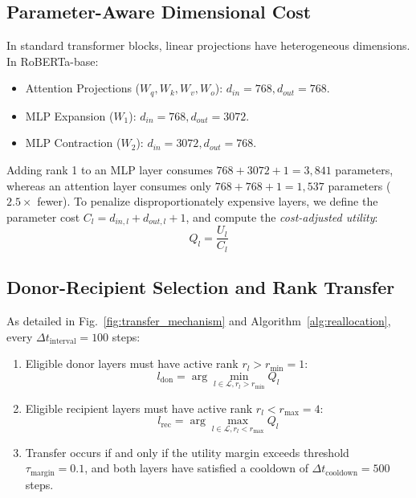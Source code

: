 \documentclass[conference]{IEEEtran}
\begin{document}
\subsection{Parameter-Aware Dimensional Cost}
In standard transformer blocks, linear projections have heterogeneous dimensions. In RoBERTa-base:
\begin{itemize}
  \item Attention Projections ($W_q, W_k, W_v, W_o$): $d_{in} = 768, d_{out} = 768$.
  \item MLP Expansion ($W_1$): $d_{in} = 768, d_{out} = 3072$.
  \item MLP Contraction ($W_2$): $d_{in} = 3072, d_{out} = 768$.
\end{itemize}
Adding rank 1 to an MLP layer consumes $768 + 3072 + 1 = 3,841$ parameters, whereas an attention layer consumes only $768 + 768 + 1 = 1,537$ parameters ($2.5\times$ fewer). To penalize disproportionately expensive layers, we define the parameter cost $C_l = d_{in,l} + d_{out,l} + 1$, and compute the \textit{cost-adjusted utility}:
\begin{equation}
  Q_l = \frac{U_l}{C_l}
  \label{eq:cost_utility}
\end{equation}

\subsection{Donor-Recipient Selection and Rank Transfer}
As detailed in Fig.~\ref{fig:transfer_mechanism} and Algorithm~\ref{alg:reallocation}, every $\Delta t_{\text{interval}} = 100$ steps:
\begin{enumerate}
  \item Eligible donor layers must have active rank $r_l > r_{\min} = 1$:
  \begin{equation}
    l_{\text{don}} = \arg\min_{l \in \mathcal{L}, r_l > r_{\min}} Q_l
  \end{equation}
  \item Eligible recipient layers must have active rank $r_l < r_{\max} = 4$:
  \begin{equation}
    l_{\text{rec}} = \arg\max_{l \in \mathcal{L}, r_l < r_{\max}} Q_l
  \end{equation}
  \item Transfer occurs if and only if the utility margin exceeds threshold $\tau_{\text{margin}} = 0.1$, and both layers have satisfied a cooldown of $\Delta t_{\text{cooldown}} = 500$ steps.
\end{enumerate}
\end{document}
